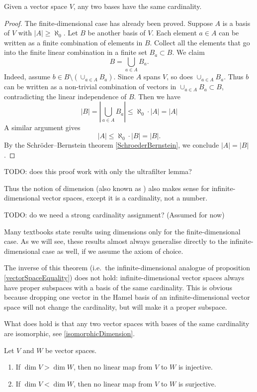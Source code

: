 \begin{theorem}
Given a vector space $V$, any two bases have the same cardinality.
\end{theorem}
\begin{proof}
The finite-dimensional case has already been proved. Suppose $A$ is a basis of $V$ with $|A| \geq \aleph_0$. Let $B$ be another basis of $V$. Each element $a\in A$ can be written as a finite combination of elements in $B$. Collect all the elements that go into the finite linear combination in a finite set $B_a \subset B$. We claim
\[ B = \bigcup_{a\in A} B_a. \]
Indeed, assume $b\in B \setminus (\cup_{a\in A} B_a)$. Since $A$ spans $V$, so does $\cup_{a\in A} B_a$. Thus $b$ can be written as a non-trivial combination of vectors in $\cup_{a\in A} B_a\subset B$, contradicting the linear independence of $B$. Then we have
\[ |B| = \left| \bigcup_{a\in A}B_a \right| \leq \aleph_0 \cdot |A| = |A| \]
A similar argument gives
\[ |A| \leq \aleph_0 \cdot |B| = |B|. \]
By the Schröder–Bernstein theorem \ref{SchroederBernstein}, we conclude $|A| = |B|$.
\end{proof}
TODO: does this proof work with only the ultrafilter lemma?

Thus the notion of dimension (also known as ) also makes sense for infinite-dimensional vector spaces, except it is a cardinality, not a number.

TODO: do we need a strong cardinality assignment? (Assumed for now)

Many textbooks state results using dimensions only for the finite-dimensional case. As we will see, these results almost always generalise directly to the infinite-dimensional case as well, if we assume the axiom of choice.

\begin{note}
The inverse of this theorem (i.e.\ the infinite-dimensional analogue of proposition \ref{vectorSpaceEquality}) does not hold: infinite-dimensional vector spaces always have proper subspaces with a basis of the same cardinality. This is obvious because dropping one vector in the Hamel basis of an infinite-dimensional vector space will not change the cardinality, but will make it a proper subspace.

What does hold is that any two vector spaces with bases of the same cardinality are isomorphic, see \ref{isomorphicDimension}.
\end{note}

 \begin{corollary}
 Let $V$ and $W$ be vector spaces.
 \begin{enumerate}
 \item If $\dim V > \dim W$, then no linear map from $V$ to $W$ is injective.
 \item If $\dim V < \dim W$, then no linear map from $V$ to $W$ is surjective.
 \end{enumerate}
 \end{corollary}

